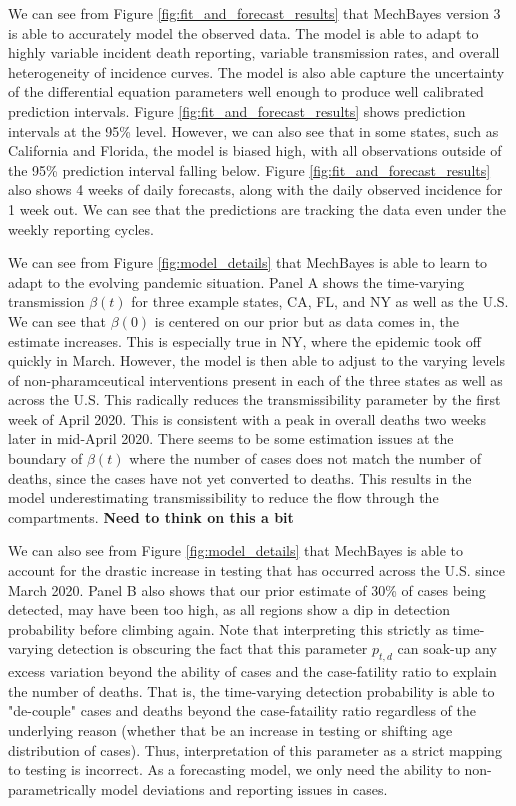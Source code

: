 \documentclass[11pt]{amsart}
\begin{document}
We can see from Figure \ref{fig:fit_and_forecast_results} that MechBayes version 3 is able to accurately model the observed data. The model is able to adapt to highly variable incident death reporting, variable transmission rates, and overall heterogeneity of incidence curves. The model is also able capture the uncertainty of the differential equation parameters well enough to produce well calibrated prediction intervals. Figure \ref{fig:fit_and_forecast_results}  shows prediction intervals at the 95\% level. However, we can also see that in some states, such as California and Florida, the model is biased high, with all observations outside of the 95\% prediction interval falling below. Figure \ref{fig:fit_and_forecast_results}  also shows 4 weeks of daily forecasts, along with the daily observed incidence for 1 week out. We can see that the predictions are tracking the data even under the weekly reporting cycles. 

We can see from Figure \ref{fig:model_details} that MechBayes is able to learn to adapt to the evolving pandemic situation. Panel A shows the time-varying transmission $\beta(t)$ for three example states, CA, FL, and NY as well as the U.S. We can see that $\beta(0)$ is centered on our prior but as data comes in, the estimate increases. This is especially true in NY, where the epidemic took off quickly in March. However, the model is then able to adjust to the varying levels of non-pharamceutical interventions present in each of the three states as well as across the U.S. This radically reduces the transmissibility parameter by the first week of April 2020. This is consistent with a peak in overall deaths two weeks later in mid-April 2020. There seems to be some estimation issues at the boundary of $\beta(t)$ where the number of cases does not match the number of deaths, since the cases have not yet converted to deaths. This results in the model underestimating transmissibility to reduce the flow through the compartments. \textbf{Need to think on this a bit}

We can also see from Figure \ref{fig:model_details}  that MechBayes is able to account for the drastic increase in testing that has occurred across the U.S. since March 2020. Panel B also shows that our prior estimate of 30\% of cases being detected, may have been too high, as all regions show a dip in detection probability before climbing again. Note that interpreting this strictly as time-varying detection is obscuring the fact that this parameter $p_{t,d}$ can soak-up any excess variation beyond the ability of cases and the case-fatility ratio to explain the number of deaths. That is, the time-varying detection probability is able to "de-couple" cases and deaths beyond the case-fataility ratio regardless of the underlying reason (whether that be an increase in testing or shifting age distribution of cases). Thus, interpretation of this parameter as a strict mapping to testing is incorrect. As a forecasting model, we only need the ability to non-parametrically model deviations and reporting issues in cases.
\end{document}
